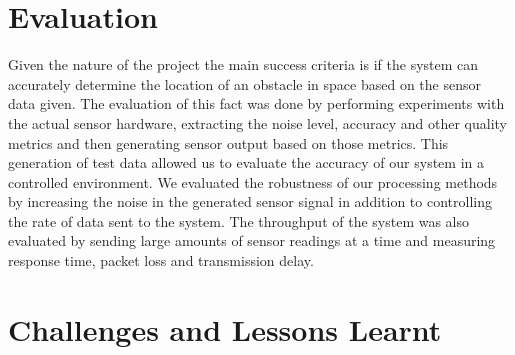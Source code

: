 \documentclass[prodmode,acmtosem]{acmsmall} %
\begin{document}


\section{Evaluation}
Given the nature of the project the main success criteria is if the system can accurately determine the location of an obstacle in space based on the sensor data given. The evaluation of this fact was done by performing experiments with the actual sensor hardware, extracting the noise level, accuracy and other quality metrics and then generating sensor output based on those metrics. This generation of test data allowed us to evaluate the accuracy of our system in a controlled environment. We evaluated the robustness of our processing methods by increasing the noise in the generated sensor signal in addition to controlling the rate of data sent to the system. The throughput of the system was also evaluated by sending large amounts of sensor readings at a time and measuring response time, packet loss and transmission delay.


\section{Challenges and Lessons Learnt}
\end{document}
